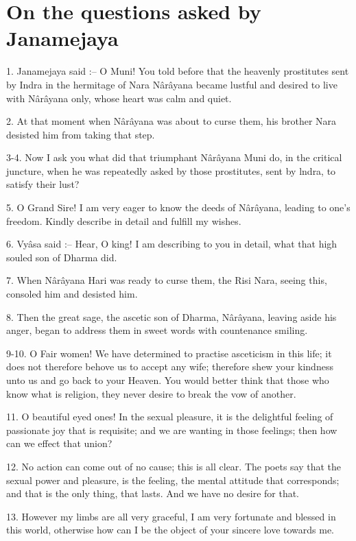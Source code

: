 ﻿\chapter{On the questions asked by Janamejaya}

1. Janamejaya said :-- O Muni! You told before that the heavenly prostitutes sent by Indra in the hermitage of Nara N\^ar\^ayana became lustful and desired to live with N\^ar\^ayana only, whose heart was calm and quiet.

2. At that moment when N\^ar\^ayana was about to curse them, his brother Nara desisted him from taking that step.

3-4. Now I ask you what did that triumphant N\^ar\^ayana Muni do, in the critical juncture, when he was repeatedly asked by those prostitutes, sent by lndra, to satisfy their lust?

5. O Grand Sire! I am very eager to know the deeds of N\^ar\^ayana, leading to one's freedom. Kindly describe in detail and fulfill my wishes.

6. Vy\^asa said :-- Hear, O king! I am describing to you in detail, what that high souled son of Dharma did.

7. When N\^ar\^ayana Hari was ready to curse them, the Risi Nara, seeing this, consoled him and desisted him.

8. Then the great sage, the ascetic son of Dharma, N\^ar\^ayana, leaving aside his anger, began to address them in sweet words with countenance smiling.

9-10. O Fair women! We have determined to practise asceticism in this life; it does not therefore behove us to accept any wife; therefore shew your kindness unto us and go back to your Heaven. You would better think that those who know what is religion, they never desire to break the vow of another.

11. O beautiful eyed ones! In the sexual pleasure, it is the delightful feeling of passionate joy that is requisite; and we are wanting in those feelings; then how can we effect that union?

12. No action can come out of no cause; this is all clear. The poets say that the sexual power and pleasure, is the feeling, the mental attitude that corresponds; and that is the only thing, that lasts. And we have no desire for that.

13. However my limbs are all very graceful, I am very fortunate and blessed in this world, otherwise how can I be the object of your sincere love towards me.

